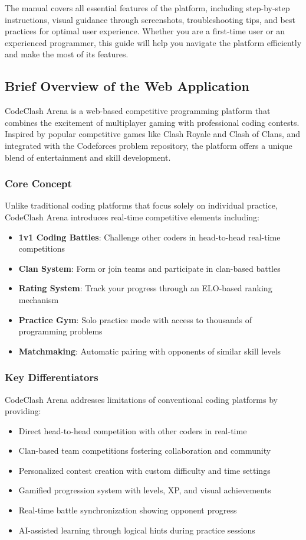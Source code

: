 \documentclass[12pt,a4paper]{article}
\begin{document}
The manual covers all essential features of the platform, including step-by-step instructions, visual guidance through screenshots, troubleshooting tips, and best practices for optimal user experience. Whether you are a first-time user or an experienced programmer, this guide will help you navigate the platform efficiently and make the most of its features.

\subsection{Brief Overview of the Web Application}

CodeClash Arena is a web-based competitive programming platform that combines the excitement of multiplayer gaming with professional coding contests. Inspired by popular competitive games like Clash Royale and Clash of Clans, and integrated with the Codeforces problem repository, the platform offers a unique blend of entertainment and skill development.

\subsubsection{Core Concept}

Unlike traditional coding platforms that focus solely on individual practice, CodeClash Arena introduces real-time competitive elements including:
\begin{itemize}
\item \textbf{1v1 Coding Battles}: Challenge other coders in head-to-head real-time competitions
\item \textbf{Clan System}: Form or join teams and participate in clan-based battles
\item \textbf{Rating System}: Track your progress through an ELO-based ranking mechanism
\item \textbf{Practice Gym}: Solo practice mode with access to thousands of programming problems
\item \textbf{Matchmaking}: Automatic pairing with opponents of similar skill levels
\end{itemize}

\subsubsection{Key Differentiators}

CodeClash Arena addresses limitations of conventional coding platforms by providing:
\begin{itemize}
\item Direct head-to-head competition with other coders in real-time
\item Clan-based team competitions fostering collaboration and community
\item Personalized contest creation with custom difficulty and time settings
\item Gamified progression system with levels, XP, and visual achievements
\item Real-time battle synchronization showing opponent progress
\item AI-assisted learning through logical hints during practice sessions
\end{itemize}
\end{document}
